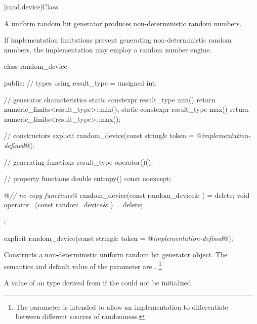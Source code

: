 

[rand.device]{Class }%
%

\pnum
A 
uniform random bit generator
produces non-deterministic random numbers.

\pnum
If implementation limitations%
prevent generating non-deterministic random numbers,
the implementation may employ a random number engine.

%
\begin{codeblock}
class random_device
{
public:
 // types
 using result_type = unsigned int;

 // generator characteristics
 static constexpr result_type min() { return numeric_limits<result_type>::min(); }
 static constexpr result_type max() { return numeric_limits<result_type>::max(); }

 // constructors
 explicit random_device(const string& token = @\textit{implementation-defined}@);

 // generating functions
 result_type operator()();

 // property functions
 double entropy() const noexcept;

 @\textit{// no copy functions}@
 random_device(const random_device& ) = delete;
 void operator=(const random_device& ) = delete;
};
\end{codeblock}


%
\begin{itemdecl}
explicit random_device(const string& token = @\textit{implementation-defined}@);
\end{itemdecl}

\begin{itemdescr}
\pnum\effects Constructs a 
 non-deterministic uniform random bit generator object.
 The semantics and default value of the 
 parameter are
 .
 \footnote{The parameter is intended
   to allow an implementation to differentiate
   between different sources of randomness.
 }

\pnum
\throws A value of an  type
 derived from 
 if the  could not be initialized.
\end{itemdescr}


